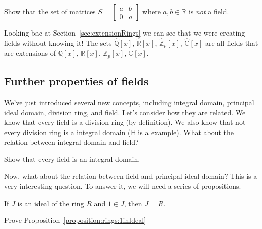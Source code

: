 \begin{exercise}
Show that the set of matrices $S=
\begin{bmatrix}
a & b\\ 
0 & a 
\end{bmatrix}$
where $a,b\in {\mathbb R}$ is \emph{not} a field.
\end{exercise}

Looking bac at Section~\ref{sec:extensionRings} we can see that we were creating fields without knowing it!  The sets $\widehat{\mathbb{Q}}[x]$, 
$\widehat{\mathbb{R}}[x]$,
$\widehat{\mathbb{Z}}_p[x]$,
$\widehat{\mathbb{C}}[x]$
are all fields that are extensions of $\mathbb{Q}[x]$, 
$\mathbb{R}[x]$,
$\mathbb{Z}_p[x]$,
$\mathbb{C}[x]$. 

\subsection{Further properties of fields}

We've just introduced several new concepts, including integral domain, principal ideal domain, division ring, and field. Let's consider how they are related. We know that every field is a division ring (by definition). We also know that not every division ring is a integral domain (${\mathbb H}$ is a example). What about the relation between integral domain and field?

\begin{exercise}\label{exercise:rings:field_is_ID}
Show that every field is an integral domain. 
\end{exercise}

Now, what about the relation between field and principal ideal domain? This is  a very interesting question. To answer it, we will need a series of propositions.

\begin{prop}\label{proposition:rings:1inIdeal}
If $J$ is an ideal of the ring $R$ and $1 \in J$, then $J = R$.
\end{prop}

\begin{exercise}\label{exercise:rings:1inIdeal}
Prove Proposition~\ref{proposition:rings:1inIdeal}
\end{exercise}




